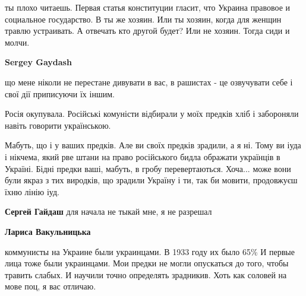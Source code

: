 \begin{itemize}
\begin{itemize}
ты плохо читаешь. Первая статья конституции гласит, что Украина правовое и
социальное государство. В ты же хозяин. Или ты хозяин, когда для женщин травлю
устраивать. А отвечать кто другой будет? Или не хозяин. Тогда сиди и молчи.


 
\textbf{Sergey Gaydash} 

що мене ніколи не перестане дивувати в вас, в рашистах - це озвучувати себе і
свої дії приписуючи їх іншим.

Росія окупувала. Російські комуністи відбирали у моїх предків хліб і забороняли
навіть говорити українською.

Мабуть, що і у ваших предків. Але ви своїх предків зрадили, а я ні. Тому ви
іуда і нікчема, який рве штани на право російського бидла ображати українців в
Україні. Бідні предки ваші, мабуть, в гробу перевертаються. Хоча... може вони
були якраз з тих виродків, що зрадили Україну і ти, так би мовити, продовжуєш
їхню лінію іуд.

 
\textbf{Сергей Гайдаш} для начала не тыкай мне, я не разрешал

 
\textbf{Лариса Вакульницька} 

коммунисты на Украине были украинцами. В 1933 году их было 65\% И первые лица
тоже были украинцами. Мои предки не могли опускаться до того, чтобы травить
слабых. И научили точно определять зрадникив. Хоть как соловей на мове поц, я
вас отличаю.

 


\end{itemize}
\end{itemize}
